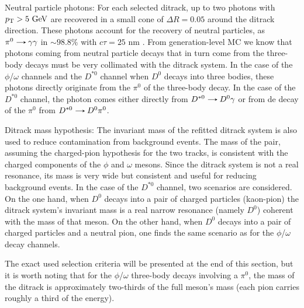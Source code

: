 \begin{myitemlist}
    \item[Neutral particle photons:] For each selected ditrack, up to two photons with $p_\text{T} > 5 \ \text{GeV}$ are recovered in a small cone of $\Delta R = 0.05$ around the ditrack direction. These photons account for the recovery of neutral particles, as $\pi^{0}\decaysto\gamma\gamma$ in $\sim 98.8\%$ with $c\tau=25$ nm \cite{PDG}. From generation-level MC we know that photons coming from neutral particle decays that in turn come from the three-body decays must be very collimated with the ditrack system. In the case of the $\phi$/$\omega$ channels and the $D^{*0}$ channel when $D^{0}$ decays into three bodies, these photons directly originate from the $\pi^0$ of the three-body decay. In the case of the $D^{*0}$ channel, the photon comes either directly from $D^{*0}\decaysto D^{0}\gamma$ or from de decay of the $\pi^0$ from $D^{*0}\decaysto D^{0}\pi^0$.
    
    \item[Ditrack mass hypothesis:] The invariant mass of the refitted ditrack system is also used to reduce contamination from background events. The mass of the pair, assuming the charged-pion hypothesis for the two tracks, is consistent with the charged components of the $\phi$ and $\omega$ mesons. Since the ditrack system is not a real resonance, its mass is very wide but consistent and useful for reducing background events. In the case of the $D^{*0}$ channel, two scenarios are considered. On the one hand, when $D^{0}$ decays into a pair of charged particles (kaon-pion) the ditrack system's invariant mass is a real narrow resonance (namely $D^{0}$) coherent with the mass of that meson. On the other hand, when $D^{0}$ decays into a pair of charged particles and a neutral pion, one finds the same scenario as for the $\phi$/$\omega$ decay channels.
    
    The exact used selection criteria will be presented at the end of this section, but it is worth noting that for the $\phi$/$\omega$ three-body decays involving a $\pi^0$, the mass of the ditrack is approximately two-thirds of the full meson's mass (each pion carries roughly a third of the energy).


\end{myitemlist}
